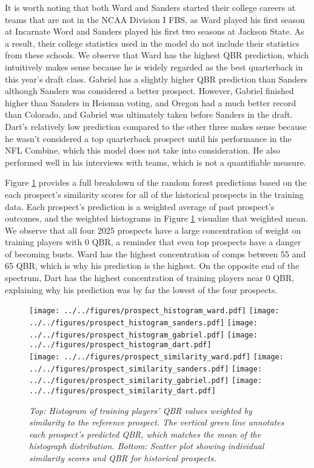 \documentclass{article}
\begin{document}
It is worth noting that both Ward and Sanders started their college careers at teams that are not in the NCAA Division I FBS, as Ward played his first season at Incarnate Word and Sanders played his first two seasons at Jackson State. As a result, their college statistics used in the model do not include their statistics from these schools. We observe that Ward has the highest QBR prediction, which intuitively makes sense because he is widely regarded as the best quarterback in this year's draft class. Gabriel has a slightly higher QBR prediction than Sanders although Sanders was considered a better prospect. However, Gabriel finished higher than Sanders in Heisman voting, and Oregon had a much better record than Colorado, and Gabriel was ultimately taken before Sanders in the draft. Dart's relatively low prediction compared to the other three makes sense because he wasn't considered a top quarterback prospect until his performance in the NFL Combine, which this model does not take into consideration. He also performed well in his interviews with teams, which is not a quantifiable measure.

Figure \ref{fig:prospect-plots} provides a full breakdown of the random forest predictions based on the each prospect's similarity scores for all of the historical prospects in the training data. Each prospect's prediction is a weighted average of past prospect's outcomes, and the weighted histograms in Figure \ref{fig:prospect-plots} visualize that weighted mean. We observe that all four 2025 prospects have a large concentration of weight on training players with 0 QBR, a reminder that even top prospects have a danger of becoming busts. Ward has the highest concentration of comps between 55 and 65 QBR, which is why his prediction is the highest. On the opposite end of the spectrum, Dart has the highest concentration of training players near 0 QBR, explaining why his prediction was by far the lowest of the four prospects.

\begin{figure}[H]
    \centering
    \texttt{[image: ../../figures/prospect\_histogram\_ward.pdf]}
    \texttt{[image: ../../figures/prospect\_histogram\_sanders.pdf]}
    \texttt{[image: ../../figures/prospect\_histogram\_gabriel.pdf]}
    \texttt{[image: ../../figures/prospect\_histogram\_dart.pdf]} \\
    \texttt{[image: ../../figures/prospect\_similarity\_ward.pdf]}
    \texttt{[image: ../../figures/prospect\_similarity\_sanders.pdf]}
    \texttt{[image: ../../figures/prospect\_similarity\_gabriel.pdf]}
    \texttt{[image: ../../figures/prospect\_similarity\_dart.pdf]}
    \caption{\textit{Top: Histogram of training players' QBR values weighted by similarity to the reference prospect. The vertical green line annotates each prospect's predicted QBR, which matches the mean of the histograph distribution. Bottom: Scatter plot showing individual similarity scores and QBR for historical prospects.}}
    \label{fig:prospect-plots}
\end{figure}
\end{document}
